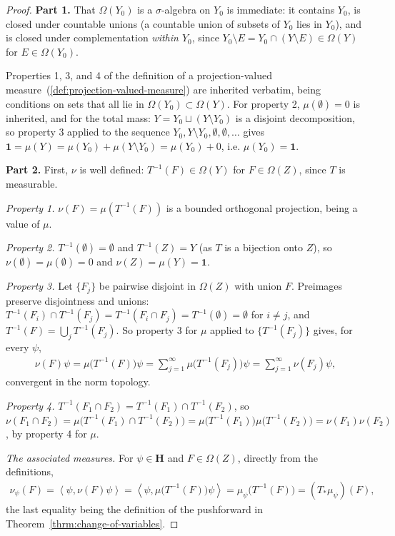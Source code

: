 \begin{proof}
    \leanok
\textbf{Part 1.} That $\Omega(Y_0)$ is a $\sigma$-algebra on $Y_0$ is immediate: it contains $Y_0$, is closed under countable unions (a countable union of subsets of $Y_0$ lies in $Y_0$), and is closed under complementation \textit{within $Y_0$}, since $Y_0 \setminus E = Y_0 \cap (Y\setminus E) \in \Omega(Y)$ for $E \in \Omega(Y_0)$.

Properties 1, 3, and 4 of the definition of a projection-valued measure~(\ref{def:projection-valued-measure}) are inherited verbatim, being conditions on sets that all lie in $\Omega(Y_0) \subset \Omega(Y)$. For property 2, $\mu(\emptyset) = 0$ is inherited, and for the total mass: $Y = Y_0 \sqcup (Y\setminus Y_0)$ is a disjoint decomposition, so property 3 applied to the sequence $Y_0, Y\setminus Y_0, \emptyset, \emptyset, \ldots$ gives $\mathbf{1} = \mu(Y) = \mu(Y_0) + \mu(Y\setminus Y_0) = \mu(Y_0) + 0$, i.e. $\mu(Y_0) = \mathbf{1}$.

\textbf{Part 2.} First, $\nu$ is well defined: $T^{-1}(F) \in \Omega(Y)$ for $F \in \Omega(Z)$, since $T$ is measurable.

\textit{Property 1.} $\nu(F) = \mu(T^{-1}(F))$ is a bounded orthogonal projection, being a value of $\mu$.

\textit{Property 2.} $T^{-1}(\emptyset) = \emptyset$ and $T^{-1}(Z) = Y$ (as $T$ is a bijection onto $Z$), so $\nu(\emptyset) = \mu(\emptyset) = 0$ and $\nu(Z) = \mu(Y) = \mathbf{1}$.

\textit{Property 3.} Let $\{F_j\}$ be pairwise disjoint in $\Omega(Z)$ with union $F$. Preimages preserve disjointness and unions: $T^{-1}(F_i) \cap T^{-1}(F_j) = T^{-1}(F_i \cap F_j) = T^{-1}(\emptyset) = \emptyset$ for $i \ne j$, and $T^{-1}(F) = \bigcup_j T^{-1}(F_j)$. So property 3 for $\mu$ applied to $\{T^{-1}(F_j)\}$ gives, for every $\psi$,
\begin{align}
    \nu(F)\psi = \mu\big(T^{-1}(F)\big)\psi = \sum_{j=1}^\infty \mu\big(T^{-1}(F_j)\big)\psi = \sum_{j=1}^\infty \nu(F_j)\psi,
\end{align}
convergent in the norm topology.

\textit{Property 4.} $T^{-1}(F_1 \cap F_2) = T^{-1}(F_1) \cap T^{-1}(F_2)$, so $\nu(F_1\cap F_2) = \mu\big(T^{-1}(F_1)\cap T^{-1}(F_2)\big) = \mu\big(T^{-1}(F_1)\big)\mu\big(T^{-1}(F_2)\big) = \nu(F_1)\nu(F_2)$, by property 4 for $\mu$.

\textit{The associated measures.} For $\psi \in \mathbf{H}$ and $F \in \Omega(Z)$, directly from the definitions,
\begin{align}
    \nu_\psi(F) = \left< \psi, \nu(F)\psi \right> = \left< \psi, \mu\big(T^{-1}(F)\big)\psi \right> = \mu_\psi\big( T^{-1}(F) \big) = (T_*\mu_\psi)(F),
\end{align}
the last equality being the definition of the pushforward in Theorem~\ref{thrm:change-of-variables}.
\end{proof}

